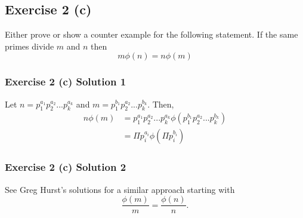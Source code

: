 \subsection*{Exercise 2 (c)}

Either prove or show a counter example for the following statement. If the same 
primes divide $m$ and $n$ then
\begin{equation}
m \phi (n) = n \phi (m)
\end{equation}

\subsubsection*{Exercise 2 (c) Solution 1}

Let $n=p_1^{a_1}p_2^{a_2}...p_k^{a_k}$ and $m=p_1^{b_1}p_2^{a_2}...p_k^{b_k}$. 
Then, 
\begin{align} 
	n \phi (m) 	&= p_1^{a_1}p_2^{a_2}...p_k^{a_k} \phi ( p_1^{b_1}p_2^{a_2}...p_k^{b_k} ) \\
				&= \Pi p_i^{a_i} \phi ( \Pi p_i^{b_i} )
\end{align}


\subsubsection*{Exercise 2 (c) Solution 2}

See Greg Hurst's solutions \cite{hurst14solutions} for a similar approach starting with 
\begin{equation}
	\frac{\phi (m)}{m} = \frac{\phi (n)}{n}.
\end{equation}